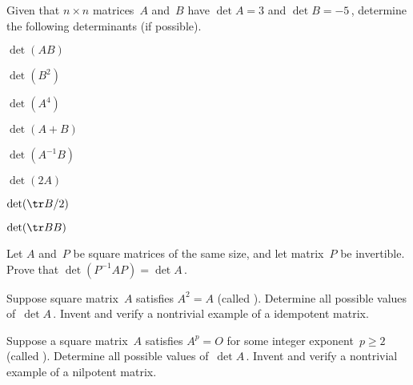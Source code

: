 \begin{exercise}  
Given that \(n\times n\) matrices~\(A\) and~\(B\) have \(\det A=3\) and \(\det B=-5\)\,, determine the following determinants (if possible).
\begin{Parts}
\item \(\det(AB)\)

\item \(\det(B^2)\)

\item \(\det(A^4)\)

\item \(\det(A+B)\)

\item \(\det(A^{-1}B)\)

\item \(\det(2A)\)

\begin{reduce}
\item \(\det(\tr B/2)\)

\item \(\det(\tr BB)\)
\end{reduce}

\end{Parts}
\end{exercise}






\begin{exercise}  
Let \(A\) and~\(P\) be square matrices of the same size, and let matrix~\(P\) be invertible.  Prove that \(\det(P^{-1}AP)=\det A\)\,.
\end{exercise}





\begin{exercise}  
Suppose square matrix~\(A\) satisfies \(A^2=A\) (called ).  Determine all possible values of~\(\det A\)\,.
Invent and verify a nontrivial example of a idempotent matrix.
\end{exercise}



\begin{exercise}  
Suppose a square matrix~\(A\) satisfies \(A^p=O\) for some integer exponent~\(p\geq 2\) (called ). 
Determine all possible values of~\(\det A\)\,.
Invent and verify a nontrivial example of a nilpotent matrix. 
\end{exercise}






